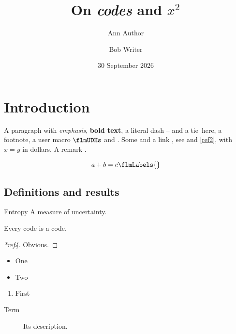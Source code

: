 \documentclass{article}
\begin{document}
\title{On \emph{codes} and \(x^2\)}
\author{Ann Author \and Bob Writer}
\date{30 September 2026}
\maketitle
\flmHeading[toc=true]
\section{Introduction}{\flmLabels{\label{ref1}}}

A paragraph with \emph{emphasis}, \textbf{bold text}, a literal dash -- and a tie~here,
a footnote, a user macro \(\flmUDHs\) and .
Some  and a link ,
see  and \eqref{ref2}, with \(x = y\) in dollars. %
A remark .

\begin{equation}
  a + b = c\flmLabels{\label{ref2}}
\end{equation}

\flmHeading[toc=true]
\subsection{Definitions and results}{\flmLabels{}}

\begin{defterm}{Entropy}\ignorespaces
A measure of uncertainty.
\end{defterm}

\begin{theorem}[Main]\flmLabels{\label{ref4}}
Every code is a code.
\end{theorem}
\begin{proof}[*ref4]
Obvious.
\end{proof}

\begin{itemize}
\item\flmLabels{\label{ref5}} One
\item Two
\end{itemize}
\begin{enumerate}
\item First
\end{enumerate}
\begin{description}
\item[Term] Its description.
\end{description}
\end{document}
